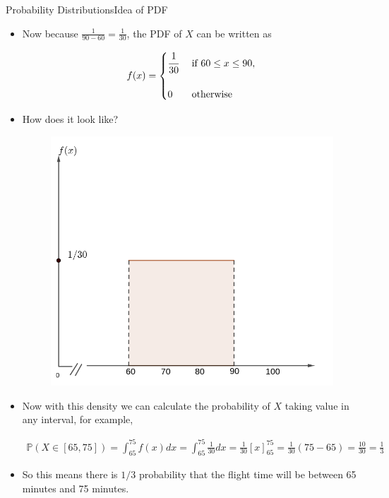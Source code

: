 \documentclass[8pt, usepdftitle=false]{beamer}
\begin{document}
\begin{frame}[allowframebreaks]{Probability Distributions}{Idea of PDF}
\begin{itemize}
\item Now because $\frac{1}{90 - 60} =  \frac{1}{30}$, the PDF of $X$ can be written as 

\begin{align*}
	f(x) = \begin{cases}
		 \cfrac{1}{30} & \text{ if } 60 \leq x \leq 90, \\
		\\
		0 & \text{ otherwise}
	\end{cases}
\end{align*}

\item  How does it look like?

\begin{figure}[H]
\includegraphics[scale = .2]{Images/Cont_Uniform.png}
	
\end{figure}


\item Now with this density we can calculate the probability of $X$ taking value in any interval, for example, 

\begin{align*}
	\mathbb{P}(X \in [65, 75]) = \int_{65}^{75} f(x) dx = \int_{65}^{75} \frac{1}{30} dx = \frac{1}{30} [x]_{65}^{75} = \frac{1}{30} (75 - 65) = \frac{10}{30} = \frac{1}{3}
\end{align*}

\item So this means there is $1/3$ probability that the flight time will be between 65 minutes and 75 minutes.


\end{itemize}
\end{frame}
\end{document}
